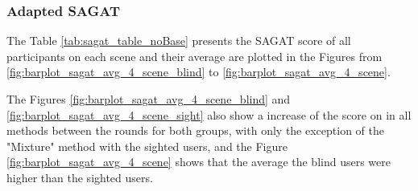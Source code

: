 \subsubsection{Adapted SAGAT}
\label{subsubsec:results_adapted_sagat_2}

The Table \ref{tab:sagat_table_noBase} presents the SAGAT score of all participants on each scene and their average are plotted in the Figures from \ref{fig:barplot_sagat_avg_4_scene_blind} to \ref{fig:barplot_sagat_avg_4_scene}. 



The Figures \ref{fig:barplot_sagat_avg_4_scene_blind} and \ref{fig:barplot_sagat_avg_4_scene_sight} also show a increase of the score on in all methods between the rounds for both groups, with only the exception of the "Mixture" method with the sighted users, and the Figure \ref{fig:barplot_sagat_avg_4_scene} shows that the average the blind users were higher than the sighted users.

